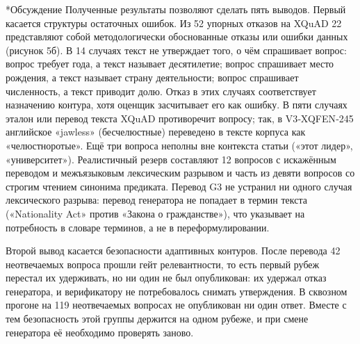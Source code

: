 \documentclass[14pt,a4paper]{extarticle}
\makeatletter
\renewcommand\section{\@startsection{section}{1}{\z@}{12pt plus 2pt}{6pt}{\normalfont\normalsize\bfseries\raggedright}}
\makeatother
\begin{document}
\section*{Обсуждение}
Полученные результаты позволяют сделать пять выводов. Первый касается структуры остаточных ошибок. Из 52 упорных отказов на XQuAD 22 представляют собой методологически обоснованные отказы или ошибки данных (рисунок 5б). В 14 случаях текст не утверждает того, о чём спрашивает вопрос: вопрос требует года, а текст называет десятилетие; вопрос спрашивает место рождения, а текст называет страну деятельности; вопрос спрашивает численность, а текст приводит долю. Отказ в этих случаях соответствует назначению контура, хотя оценщик засчитывает его как ошибку. В пяти случаях эталон или перевод текста XQuAD противоречит вопросу; так, в V3‑XQFEN‑245 английское «jawless» (бесчелюстные) переведено в тексте корпуса как «челюстноротые». Ещё три вопроса неполны вне контекста статьи («этот лидер», «университет»). Реалистичный резерв составляют 12 вопросов с искажённым переводом и межъязыковым лексическим разрывом и часть из девяти вопросов со строгим чтением синонима предиката. Перевод G3 не устранил ни одного случая лексического разрыва: перевод генератора не попадает в термин текста («Nationality Act» против «Закона о гражданстве»), что указывает на потребность в словаре терминов, а не в переформулировании.

Второй вывод касается безопасности адаптивных контуров. После перевода 42 неотвечаемых вопроса прошли гейт релевантности, то есть первый рубеж перестал их удерживать, но ни один не был опубликован: их удержал отказ генератора, и верификатору не потребовалось снимать утверждения. В сквозном прогоне на 119 неотвечаемых вопросах не опубликован ни один ответ. Вместе с тем безопасность этой группы держится на одном рубеже, и при смене генератора её необходимо проверять заново.
\end{document}
